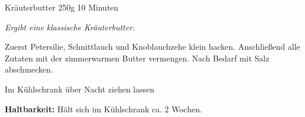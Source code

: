 \begin{recipe}{Kräuterbutter} {250g} {10 Minuten}

\freeform
\textit{Ergibt eine klassische Kräuterbutter.}


Zuerst Petersilie, Schnittlauch und Knoblauchzehe klein hacken.
Anschließend alle Zutaten mit der zimmerwarmen Butter vermengen.
Nach Bedarf mit Salz abschmecken.

\newstep
Im Kühlschrank über Nacht ziehen lassen

\freeform
\hrulefill

\freeform 
\textbf{Haltbarkeit:}
Hält sich im Kühlschrank ca. 2 Wochen.

\end{recipe}
